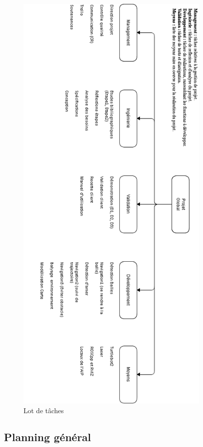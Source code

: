 \documentclass[10pt,a4paper]{article}
\begin{document}
\begin{figure}
  \centering
\noindent\includegraphics[width=9.5cm]{lottaches.png} 
  \caption{Lot de tâches}
\end{figure}

\subsection{Planning général}
\end{document}
